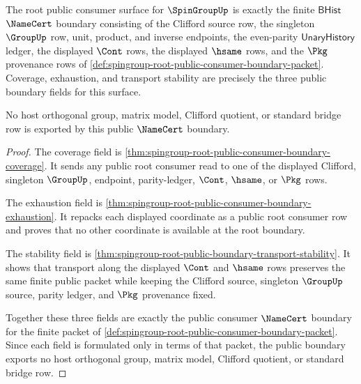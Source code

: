 \begin{theorem}
\label{thm:spingroup-root-public-consumer-namecert-boundary}
The root public consumer surface for $\SpinGroupUp$ is exactly the finite
$\mathsf{BHist}$ $\NameCert$ boundary consisting of the Clifford source row,
the singleton $\GroupUp$ row, unit, product, and inverse endpoints, the
even-parity $\mathsf{UnaryHistory}$ ledger, the displayed $\Cont$ rows, the
displayed $\hsame$ rows, and the $\Pkg$ provenance rows of
\autoref{def:spingroup-root-public-consumer-boundary-packet}. Coverage,
exhaustion, and transport stability are precisely the three public boundary
fields for this surface.

No host orthogonal group, matrix model, Clifford quotient, or standard
bridge row is exported by this public $\NameCert$ boundary.
\end{theorem}
\begin{proof}
The coverage field is
\autoref{thm:spingroup-root-public-consumer-boundary-coverage}. It sends any
public root consumer read to one of the displayed Clifford, singleton
$\GroupUp$, endpoint, parity-ledger, $\Cont$, $\hsame$, or $\Pkg$ rows.

The exhaustion field is
\autoref{thm:spingroup-root-public-consumer-boundary-exhaustion}. It repacks
each displayed coordinate as a public root consumer row and proves that no
other coordinate is available at the root boundary.

The stability field is
\autoref{thm:spingroup-root-public-boundary-transport-stability}. It shows
that transport along the displayed $\Cont$ and $\hsame$ rows preserves the
same finite public packet while keeping the Clifford source, singleton
$\GroupUp$ source, parity ledger, and $\Pkg$ provenance fixed.

Together these three fields are exactly the public consumer
$\NameCert$ boundary for the finite packet of
\autoref{def:spingroup-root-public-consumer-boundary-packet}. Since each
field is formulated only in terms of that packet, the public boundary exports
no host orthogonal group, matrix model, Clifford quotient, or standard bridge
row.
\end{proof}

